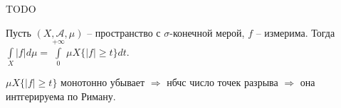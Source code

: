 TODO

\begin{theorem}
    Пусть $(X, \mathcal{A}, \mu)$ – пространство с $\sigma$-конечной мерой, $f$ – измерима. Тогда $\int\limits_X |f| d\mu=
    \int\limits_0^{+\infty} \mu X \{|f| \geq t\} dt$.
\end{theorem}

\begin{remark}
    $\mu X \{|f| \geq t\}$ монотонно убывает $\Rightarrow$ нбчс число точек разрыва $\Rightarrow$ она интгерируема по Риману.
\end{remark}